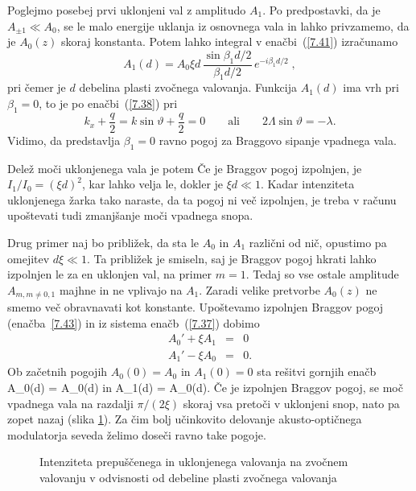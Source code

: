 Poglejmo posebej prvi uklonjeni val z amplitudo $A_{1}$. Po predpostavki,
da je $A_{\pm1}\ll A_{0}$, se le malo energije uklanja iz osnovnega
vala in lahko privzamemo, da je $A_{0}(z)$ skoraj konstanta. 
Potem lahko integral v enačbi~(\ref{7.41})
izračunamo
\begin{equation}
A_{1}(d)=A_{0}\xi d\,\frac{\sin\beta_{1}d/2}{\beta_{1}d/2}\, e^{-i\beta_{1}d/2}\;,
\label{7.41a}
\end{equation}
pri čemer je $d$ debelina plasti zvočnega valovanja.
Funkcija $A_{1}(d)$ ima vrh pri $\beta_{1}=0$, to je po enačbi~(\ref{7.38}) pri 
\begin{equation}
k_x+ \frac{q}{2} = k \sin\vartheta + \frac{q}{2} = 0
\qquad \mathrm{ali} \qquad 
2\Lambda\sin\vartheta=-\lambda.
\label{7.43}
\end{equation}
Vidimo, da predstavlja $\beta_{1}=0$ ravno pogoj za Braggovo sipanje vpadnega
vala.

Delež moči uklonjenega vala je potem
Če je Braggov pogoj izpolnjen, je $I_{1}/I_{0}=(\xi d)^{2}$,
kar lahko velja le, dokler je $\xi d\ll1$. Kadar intenziteta uklonjenega žarka
tako naraste, da ta pogoj ni več izpolnjen, je treba v računu upoštevati tudi 
zmanjšanje moči vpadnega snopa.

Drug primer naj bo približek, da sta le $A_{0}$ in $A_{1}$ različni od nič, 
opustimo pa omejitev $d\xi\ll 1$. Ta približek je smiseln, saj je 
Braggov pogoj hkrati lahko izpolnjen le za en uklonjen val, na
primer $m=1$. Tedaj so vse ostale amplitude $A_{m, m\ne0,1}$
majhne in ne vplivajo na $A_{1}$. Zaradi velike pretvorbe 
$A_{0}(z)$ ne smemo več obravnavati kot konstante. Upoštevamo 
izpolnjen Braggov pogoj (enačba~\ref{7.43}) in iz sistema enačb~(\ref{7.37})
dobimo
\begin{eqnarray}
A_{0}'+\xi A_{1} & = & 0\nonumber \\
A_{1}'-\xi A_{0} & = & 0.
\end{eqnarray}
Ob začetnih pogojih $A_{0}(0)=A_{0}$ in $A_{1}(0)=0$ sta rešitvi gornjih enačb
\beq
A_{0}(d) = A_{0}\cos (\xi d)
\eeq
in
\beq
A_{1}(d) = A_{0}\sin (\xi d).
\eeq
Če je izpolnjen Braggov pogoj, se moč vpadnega vala na razdalji $\pi/(2\xi)$
skoraj vsa pretoči v uklonjeni snop, nato pa zopet nazaj (slika \ref{s7.10}).
Za čim bolj učinkovito delovanje akusto-optičnega modulatorja seveda
želimo doseči ravno take pogoje.
\begin{figure}[h]
\centering
\def\svgwidth{90truemm} 

\caption{Intenziteta prepuščenega in uklonjenega valovanja na zvočnem valovanju v
odvisnosti od debeline plasti zvočnega valovanja}
\label{s7.10}
\end{figure}

